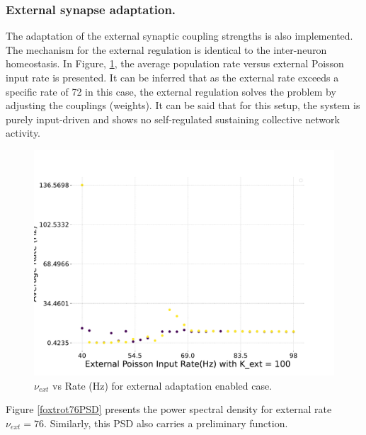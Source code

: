 \documentclass[a4paper,12pt]{article}
\begin{document}
\subsubsection{External synapse adaptation.}
The adaptation of the external synaptic coupling strengths is also implemented. The mechanism for the external regulation is identical to the inter-neuron homeostasis. In Figure, \ref{foxtrot}, the average population rate versus external Poisson input rate is presented. It can be inferred that as the external rate exceeds a specific rate of 72 in this case, the external regulation solves the problem by adjusting the couplings (weights). It can be said that for this setup, the system is purely input-driven and shows no self-regulated sustaining collective network activity.

\begin{figure}[htb!] 
    \centering
    \includegraphics[width=\linewidth]{nuext_vs_activity_foxtrot.pdf}
    \caption{$\nu_{ext}$ vs Rate (Hz) for external adaptation enabled case.}
    \label{foxtrot}
\end{figure}
Figure \ref{foxtrot76PSD} presents the power spectral density for external rate $\nu_{ext} = 76$. Similarly, this PSD also carries a preliminary function.
\end{document}
